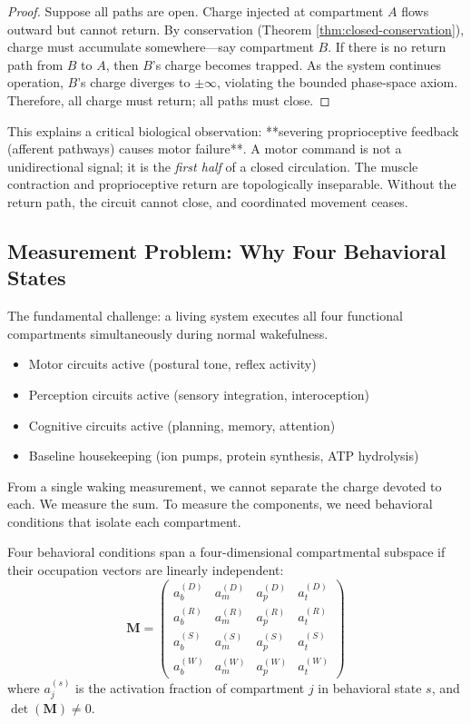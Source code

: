 \begin{proof}
Suppose all paths are open. Charge injected at compartment $A$ flows outward but cannot return. By conservation (Theorem \ref{thm:closed-conservation}), charge must accumulate somewhere—say compartment $B$. If there is no return path from $B$ to $A$, then $B$'s charge becomes trapped. As the system continues operation, $B$'s charge diverges to $\pm\infty$, violating the bounded phase-space axiom. Therefore, all charge must return; all paths must close.
\end{proof}

This explains a critical biological observation: **severing proprioceptive feedback (afferent pathways) causes motor failure**. A motor command is not a unidirectional signal; it is the \emph{first half} of a closed circulation. The muscle contraction and proprioceptive return are topologically inseparable. Without the return path, the circuit cannot close, and coordinated movement ceases.

\subsection{Measurement Problem: Why Four Behavioral States}

The fundamental challenge: a living system executes all four functional compartments simultaneously during normal wakefulness.
\begin{itemize}
\item Motor circuits active (postural tone, reflex activity)
\item Perception circuits active (sensory integration, interoception)
\item Cognitive circuits active (planning, memory, attention)
\item Baseline housekeeping (ion pumps, protein synthesis, ATP hydrolysis)
\end{itemize}

From a single waking measurement, we cannot separate the charge devoted to each. We measure the sum. To measure the components, we need behavioral conditions that isolate each compartment.

\begin{theorem}
\label{thm:orthogonal-basis}
Four behavioral conditions span a four-dimensional compartmental subspace if their occupation vectors are linearly independent:
\begin{equation}
\mathbf{M} = \begin{pmatrix}
a_b^{(D)} & a_m^{(D)} & a_p^{(D)} & a_t^{(D)} \\
a_b^{(R)} & a_m^{(R)} & a_p^{(R)} & a_t^{(R)} \\
a_b^{(S)} & a_m^{(S)} & a_p^{(S)} & a_t^{(S)} \\
a_b^{(W)} & a_m^{(W)} & a_p^{(W)} & a_t^{(W)}
\end{pmatrix}
\end{equation}
where $a_j^{(s)}$ is the activation fraction of compartment $j$ in behavioral state $s$, and $\det(\mathbf{M}) \neq 0$.
\end{theorem}

